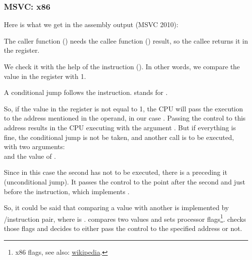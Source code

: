 \subsubsection{MSVC: x86}

Here is what we get in the assembly output (MSVC 2010):



The \gls{caller} function (\main) needs the \gls{callee} function (\scanf) result, 
so the \gls{callee} returns it in the \EAX register.

We check it with the help of the instruction  (). In other words, we compare the value in the \EAX register with 1.

A \JNE conditional jump follows the \CMP instruction. \JNE stands for .

So, if the value in the \EAX register is not equal to 1, the \ac{CPU} will pass the execution to the address mentioned in the \JNE operand, in our case .
Passing the control to this address results in the \ac{CPU} executing \printf with the argument .
But if everything is fine, the conditional jump is not be taken, and another \printf call is to be executed, with two arguments:\\
 and the value of .

Since in this case the second \printf has not to be executed, there is a \JMP preceding it (unconditional jump). 
It passes the control to the point after the second \printf and just before the  instruction, which implements .

So, it could be said that comparing a value with another is  implemented by \CMP/\Jcc instruction pair, where  is .
\CMP compares two values and sets processor flags\footnote{x86 flags, see also: \href{http://go.yurichev.com/17120}{wikipedia}.}.
\Jcc checks those flags and decides to either pass the control to the specified address or not.

